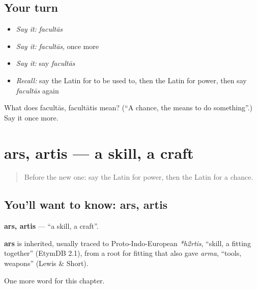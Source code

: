 \subsection*{Your turn}
\begin{itemize}
\raggedright
  \item \emph{Say it:} \emph{facultās}
  \item \emph{Say it:} \emph{facultās}, once more
  \item \emph{Say it:} say \emph{facultās}
  \item \emph{Recall:} say the Latin for to be used to, then the Latin for power, then say \emph{facultās} again
\end{itemize}

\begin{tcolorbox}[breakable,colback=teal!4,colframe=teal!35!black,title={Before you move on}]
What does facultās, facultātis mean? (\textquotedblleft{}A chance, the means to do something\textquotedblright{}.) Say it once more.
\end{tcolorbox}
\section[ars, artis]{ars, artis — a skill, a craft}

\label{lesson:LA-C110-ars}



\begin{quote}
Before the new one: say the Latin for power, then the Latin for a chance.
\end{quote}

\subsection*{You'll want to know: ars, artis}
\textbf{ars, artis} — \textquotedblleft{}a skill, a craft\textquotedblright{}.

\begin{cousinweb}
\textbf{ars} is inherited, usually traced to Proto-Indo-European \emph{*h2rtis}, \textquotedblleft{}skill, a fitting together\textquotedblright{} (EtymDB 2.1), from a root for fitting that also gave \emph{arma}, \textquotedblleft{}tools, weapons\textquotedblright{} (Lewis \& Short).
\end{cousinweb}

\begin{grammarlens}[title={What you've built}]
One more word for this chapter.
\end{grammarlens}

